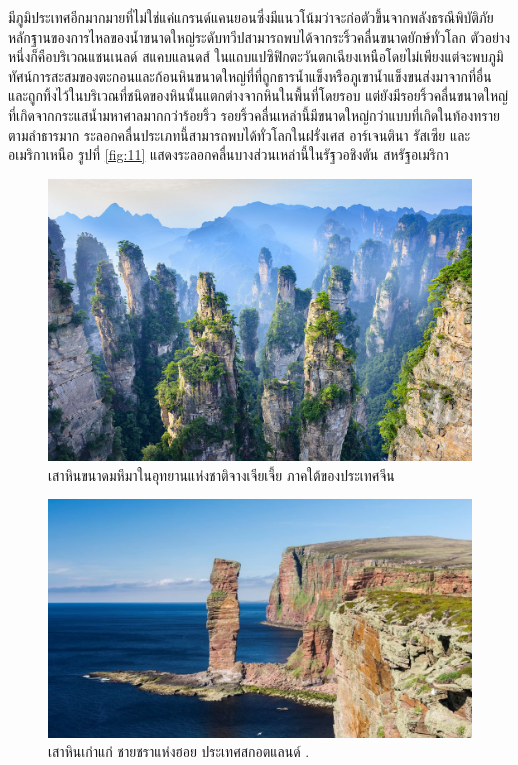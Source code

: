 \documentclass[10pt,twocolumn,letterpaper]{article}
\begin{document}
มีภูมิประเทศอีกมากมายที่ไม่ใช่แค่แกรนด์แคนยอนซึ่งมีแนวโน้มว่าจะก่อตัวขึ้นจากพลังธรณีพิบัติภัย หลักฐานของการไหลของน้ำขนาดใหญ่ระดับทวีปสามารถพบได้จากระริ้วคลื่นขนาดยักษ์ทั่วโลก ตัวอย่างหนึ่งก็คือบริเวณแชนเนลด์ สแคบแลนดส์ ในแถบแปซิฟิกตะวันตกเฉียงเหนือโดยไม่เพียงแต่จะพบภูมิทัศน์การสะสมของตะกอนและก้อนหินขนาดใหญ่ที่ที่ถูกธารน้ำแข็งหรือภูเขาน้ำแข็งขนส่งมาจากที่อื่น และถูกทิ้งไว้ในบริเวณที่ชนิดของหินนั้นแตกต่างจากหินในพื้นที่โดยรอบ แต่ยังมีรอยริ้วคลื่นขนาดใหญ่ที่เกิดจากกระแสน้ำมหาศาลมากกว่าร้อยริ้ว \cite{78,79} รอยริ้วคลื่นเหล่านี้มีขนาดใหญ่กว่าแบบที่เกิดในท้องทรายตามลำธารมาก ระลอกคลื่นประเภทนี้สามารถพบได้ทั่วโลกในฝรั่งเศส อาร์เจนตินา รัสเซีย และอเมริกาเหนือ \cite{81} รูปที่ \ref{fig:11} แสดงระลอกคลื่นบางส่วนเหล่านี้ในรัฐวอชิงตัน สหรัฐอเมริกา \cite{80}

\begin{figure}[t]
\begin{center}
   \includegraphics[width=1\linewidth]{zhangjiajie.jpg}
\end{center}
   \caption{เสาหินขนาดมหึมาในอุทยานแห่งชาติจางเจียเจี้ย ภาคใต้ของประเทศจีน}
\label{fig:12}
\label{fig:onecol}
\end{figure}

\begin{figure}[t]
\begin{center}

   \includegraphics[width=1\linewidth]{hoy.jpg}
\end{center}
   \caption{เสาหินเก่าแก่ ชายชราแห่งฮอย ประเทศสกอตแลนด์ \cite{83}.}
\label{fig:13}
\label{fig:onecol}
\end{figure}
\end{document}
